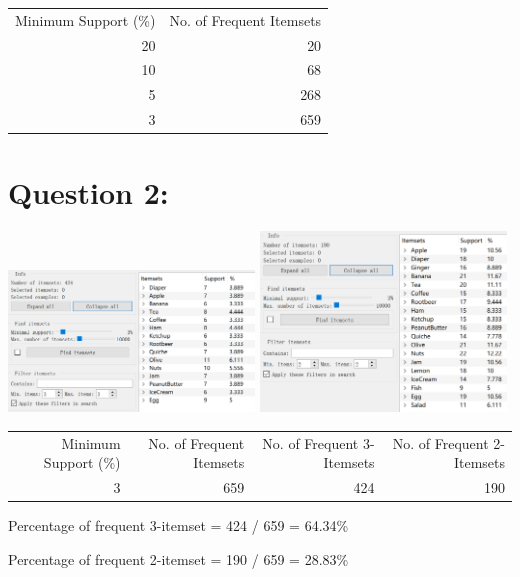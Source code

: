 \documentclass[titlepage]{article}
\begin{document}
\begin{center}
\begin{tabular}{rr}
\hline
Minimum Support (\%) & No. of Frequent Itemsets\\
20 & 20\\
10 & 68\\
5 & 268\\
3 & 659\\
\hline
\end{tabular}
\end{center}

\section{Question 2:}
\label{sec:orgaf7f53e}
\begin{center}
\includegraphics[width=0.49\textwidth]{minsup3_3.png}
\includegraphics[width=0.49\textwidth]{minsup3_2.png}
\end{center}

\begin{center}
\begin{tabular}{rrrr}
\hline
Minimum Support (\%) & No. of Frequent Itemsets & No. of Frequent 3-Itemsets & No. of Frequent 2-Itemsets\\
3 & 659 & 424 & 190\\
\hline
\end{tabular}
\end{center}

Percentage of frequent 3-itemset = 424 / 659 = 64.34\%

Percentage of frequent 2-itemset = 190 / 659 = 28.83\%
\end{document}
